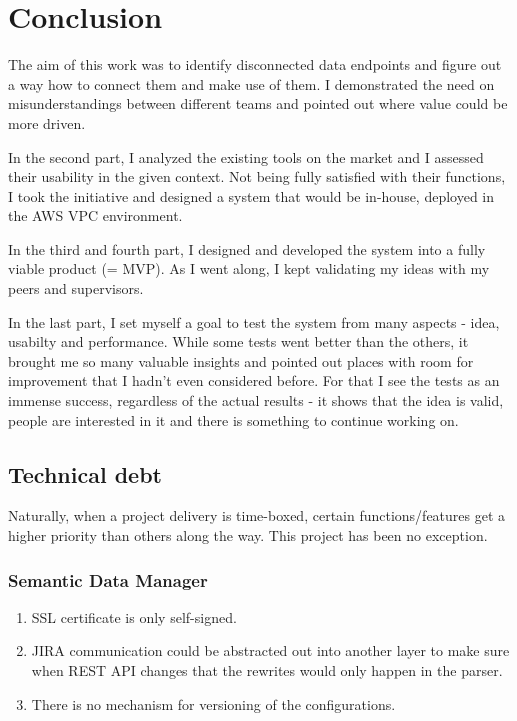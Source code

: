 \chapter{Conclusion}

The aim of this work was to identify disconnected data endpoints and figure out a way how to connect them and make use of them. I demonstrated the need on misunderstandings between different teams and pointed out where value could be more driven.

In the second part, I analyzed the existing tools on the market and I assessed their usability in the given context. Not being fully satisfied with their functions, I took the initiative and designed a system that would be in-house, deployed in the AWS VPC environment. 

In the third and fourth part, I designed and developed the system into a fully viable product (= MVP). As I went along, I kept validating my ideas with my peers and supervisors.

In the last part, I set myself a goal to test the system from many aspects - idea, usabilty and performance. While some tests went better than the others, it brought me so many valuable insights and pointed out places with room for improvement that I hadn't even considered before. For that I see the tests as an immense success, regardless of the actual results - it shows that the idea is valid, people are interested in it and there is something to continue working on.

\section{Technical debt}

Naturally, when a project delivery is time-boxed, certain functions/features get a higher priority than others along the way. This project has been no exception.

\subsection{Semantic Data Manager}

\begin{enumerate}
	\item SSL certificate is only self-signed.
	\item JIRA communication could be abstracted out into another layer to make sure when REST API changes that the rewrites would only happen in the parser.
	\item There is no mechanism for versioning of the configurations.
\end{enumerate}

